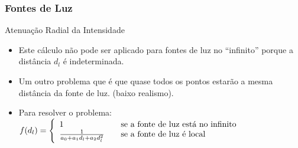\documentclass{beamer}
\begin{document}
\begin{frame}
\frametitle{Fontes de Luz}

	\begin{block}{Atenuação Radial da Intensidade}
		\begin{itemize}
			\item Este cálculo não pode ser aplicado para fontes de luz no ``infinito'' porque a distância $d_l$ é indeterminada.
			\item Um outro problema que é que quase todos os pontos estarão a mesma distância da fonte de luz. (baixo realismo).
			\item Para resolver o problema:
			$ f(d_l) = \left\{ 
  					\begin{array}{l l}
   						 1 & \quad \text{se a fonte de luz está no infinito}\\
    						\frac{1}{a_0 + a_1d_l + a_2d^{2}_{l}} & \quad \text{se a fonte de luz é local}
  					\end{array} \right.$ 
		\end{itemize}
	\end{block}
\end{frame}


\end{document}
